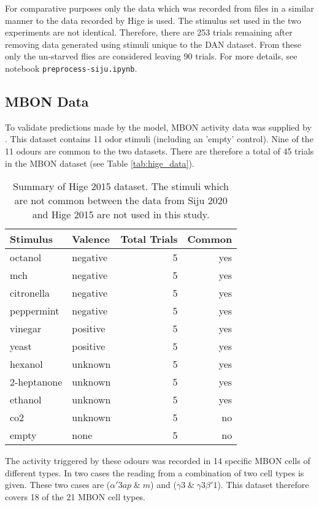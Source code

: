 \documentclass[11pt, A4]{article}
\begin{document}
\begin{multicols}{2}
For comparative purposes only the data which was recorded from files in a similar manner to the data recorded by Hige is used. The stimulus set used in the two experiments are not identical. Therefore, there are 253 trials remaining after removing data generated using stimuli unique to the DAN dataset. From these only the un-starved flies are considered leaving 90 trials. For more details, see notebook \texttt{preprocess-siju.ipynb}.

		

\subsection{MBON Data}

To validate predictions made by the model, MBON activity data was supplied by \cite{hige2015}. This dataset contains 11 odor stimuli (including an 'empty' control). Nine of the 11 odours are common to the two datasets. There are therefore a total of 45 trials in the MBON dataset (see Table \ref{tab:hige_data}).

\begin{table}[H]
\begin{center}
\begin{tabular}{l | l | r | r  }
\hline
Stimulus & Valence & Total Trials & Common \\
\hline
octanol & negative & 5 & yes \\
mch	& negative & 5 & yes \\
citronella & negative & 5 & yes \\
peppermint & negative & 5 & yes \\
vinegar		& positive & 5 & yes \\
yeast 		 & positive &5 & yes \\
hexanol	& unknown & 5 & yes \\
2-heptanone & unknown & 5 & yes \\
ethanol & unknown &5 & yes \\
co2 & unknown & 5 & no \\
empty & none & 5 & no \\
\hline
\end{tabular}
\end{center}
\caption{Summary of Hige 2015 dataset. The stimuli which are not common between the data from Siju 2020 and Hige 2015 are not used in this study.}
\label{tab:hige_data}
\label{default}
\end{table}%


The activity triggered by these odours was recorded in 14 specific MBON cells of different types. In two cases the reading from a combination of two cell types is given. These two cases are ($\alpha'3ap \; \&\; m$) and ($\gamma3 \; \& \; \gamma3 \beta'1$). This dataset therefore covers 18 of the 21 MBON cell types.


\end{multicols}
\end{document}
